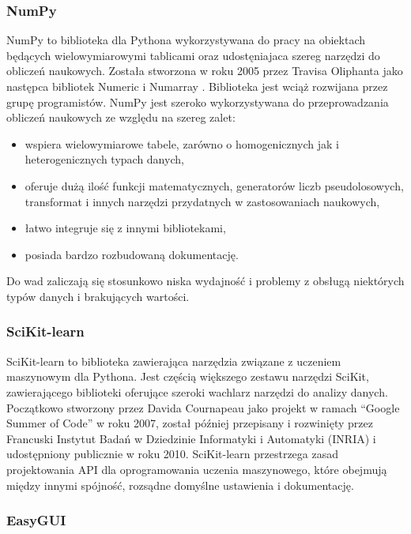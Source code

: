 \documentclass[12pt,twoside]{article}
\begin{document}
\subsubsection{NumPy}

NumPy to biblioteka dla Pythona wykorzystywana do pracy na obiektach będących wielowymiarowymi tablicami
oraz udostęniajaca szereg narzędzi do obliczeń naukowych. Została stworzona w roku 2005 przez Travisa Oliphanta
jako następca bibliotek Numeric \cite{numeric} i Numarray \cite{numarray}. Biblioteka jest wciąż rozwijana przez grupę programistów.
NumPy jest szeroko wykorzystywana do przeprowadzania obliczeń naukowych ze względu na szereg zalet: \cite{numpy2}\cite{numpy3}

\begin{itemize}[label=-,labelsep=0.4cm, leftmargin=1.25cm]
    \item wspiera wielowymiarowe tabele, zarówno o homogenicznych jak i heterogenicznych typach danych,
    \item oferuje dużą ilość funkcji matematycznych, generatorów liczb pseudolosowych, transformat i innych narzędzi
          przydatnych w zastosowaniach naukowych,
    \item łatwo integruje się z innymi bibliotekami,
    \item posiada bardzo rozbudowaną dokumentację.
\end{itemize}

Do wad zaliczają się stosunkowo niska wydajność i problemy z obsługą niektórych typów danych i brakujących wartości. \cite{numpy3}

\subsubsection{SciKit-learn}

SciKit-learn to biblioteka zawierająca narzędzia związane z uczeniem maszynowym dla Pythona.
Jest częścią większego zestawu narzędzi SciKit,
zawierającego biblioteki oferujące szeroki wachlarz narzędzi do analizy danych.
Początkowo stworzony przez Davida Cournapeau jako projekt w ramach ``Google Summer of Code'' w roku 2007,
został później przepisany i rozwinięty przez Francuski Instytut Badań w Dziedzinie Informatyki i Automatyki (INRIA)
i udostępniony publicznie w roku 2010.\cite{inria}
SciKit-learn przestrzega zasad projektowania API dla oprogramowania uczenia maszynowego,
które obejmują między innymi spójność, rozsądne domyślne ustawienia i dokumentację. \cite{scikit}

\subsubsection{EasyGUI}
\end{document}
